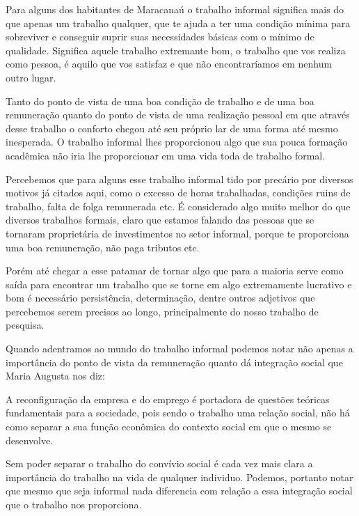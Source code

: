 Para alguns dos habitantes de Maracanaú o trabalho informal significa mais do 
que apenas um trabalho qualquer, que te ajuda a ter uma condição mínima para 
sobreviver e conseguir suprir suas necessidades básicas com o mínimo de 
qualidade. Significa aquele trabalho extremante bom, o trabalho que vos realiza 
como pessoa, é aquilo que vos satisfaz e que não encontraríamos em nenhum outro 
lugar. 

Tanto do ponto de vista de uma boa condição de trabalho e de uma boa 
remuneração quanto do ponto de vista de uma realização pessoal em que através 
desse trabalho o conforto chegou até seu próprio lar de uma forma até mesmo 
inesperada. O trabalho informal lhes proporcionou algo que sua pouca formação 
acadêmica não iria lhe proporcionar em uma vida toda de trabalho formal.

Percebemos que para alguns esse trabalho informal tido por precário por diversos 
motivos já citados aqui, como o excesso de horas trabalhadas, condições ruins de 
trabalho, falta de folga remunerada etc. É considerado algo muito melhor do que 
diversos trabalhos formais, claro que estamos falando das pessoas que se 
tornaram proprietária de investimentos no setor informal, porque te proporciona 
uma boa remuneração, não paga tributos etc. 

Porém até chegar a esse patamar de 
tornar algo que para a maioria serve como saída para encontrar um trabalho que 
se torne em algo extremamente lucrativo e bom é necessário persistência, 
determinação, dentre outros adjetivos que percebemos serem precisos ao longo, 
principalmente do nosso trabalho de pesquisa. 

Quando adentramos ao mundo do trabalho informal podemos notar não apenas a 
importância do ponto de vista da remuneração quanto dá integração social que 
Maria Augusta nos diz:

\begin{citacao}
A reconfiguração da empresa e do emprego é portadora de questões teóricas 
fundamentais para a sociedade, pois sendo o trabalho uma relação social, não há 
como separar a sua função econômica do contexto social em que o mesmo se 
desenvolve. \cite{augusta}
\end{citacao}

Sem poder separar o trabalho do convívio social é cada vez mais clara a 
importância do trabalho na vida de qualquer individuo. Podemos, portanto notar 
que mesmo que seja informal nada diferencia com relação a essa integração social 
que o trabalho nos proporciona.

